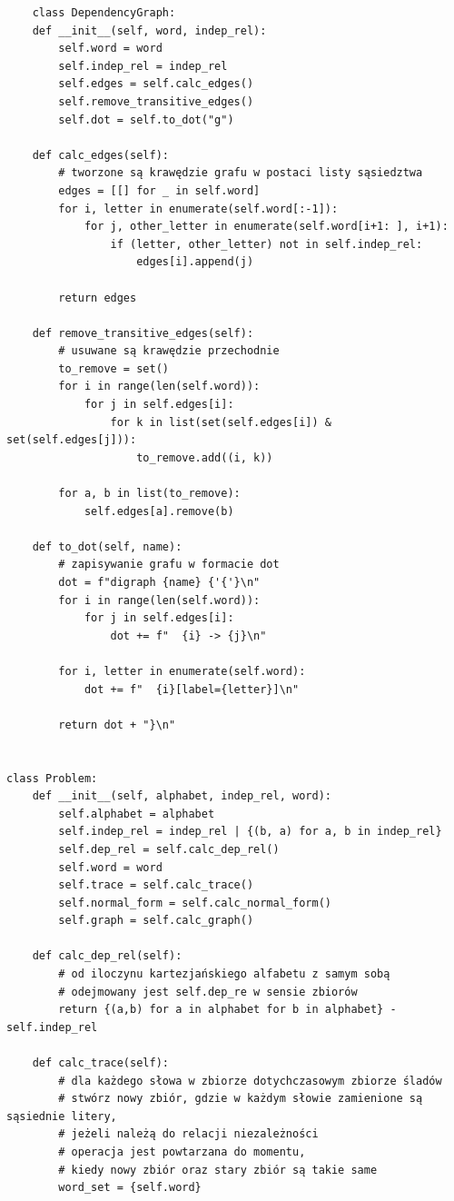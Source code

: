 \documentclass{article}
\begin{document}
\begin{verbatim}
    class DependencyGraph:
    def __init__(self, word, indep_rel):
        self.word = word
        self.indep_rel = indep_rel
        self.edges = self.calc_edges()
        self.remove_transitive_edges()
        self.dot = self.to_dot("g")

    def calc_edges(self):
        # tworzone są krawędzie grafu w postaci listy sąsiedztwa
        edges = [[] for _ in self.word]
        for i, letter in enumerate(self.word[:-1]):
            for j, other_letter in enumerate(self.word[i+1: ], i+1):
                if (letter, other_letter) not in self.indep_rel:
                    edges[i].append(j)
        
        return edges

    def remove_transitive_edges(self):
        # usuwane są krawędzie przechodnie
        to_remove = set()
        for i in range(len(self.word)):
            for j in self.edges[i]:
                for k in list(set(self.edges[i]) & set(self.edges[j])):
                    to_remove.add((i, k))

        for a, b in list(to_remove):
            self.edges[a].remove(b)

    def to_dot(self, name):
        # zapisywanie grafu w formacie dot
        dot = f"digraph {name} {'{'}\n"
        for i in range(len(self.word)):
            for j in self.edges[i]:
                dot += f"  {i} -> {j}\n"
        
        for i, letter in enumerate(self.word):
            dot += f"  {i}[label={letter}]\n" 

        return dot + "}\n"
    

class Problem:
    def __init__(self, alphabet, indep_rel, word):
        self.alphabet = alphabet
        self.indep_rel = indep_rel | {(b, a) for a, b in indep_rel}
        self.dep_rel = self.calc_dep_rel()
        self.word = word
        self.trace = self.calc_trace()
        self.normal_form = self.calc_normal_form()
        self.graph = self.calc_graph()

    def calc_dep_rel(self):
        # od iloczynu kartezjańskiego alfabetu z samym sobą
        # odejmowany jest self.dep_re w sensie zbiorów
        return {(a,b) for a in alphabet for b in alphabet} - self.indep_rel

    def calc_trace(self):
        # dla każdego słowa w zbiorze dotychczasowym zbiorze śladów
        # stwórz nowy zbiór, gdzie w każdym słowie zamienione są sąsiednie litery,
        # jeżeli należą do relacji niezależności
        # operacja jest powtarzana do momentu, 
        # kiedy nowy zbiór oraz stary zbiór są takie same
        word_set = {self.word}


\end{verbatim}
\end{document}
